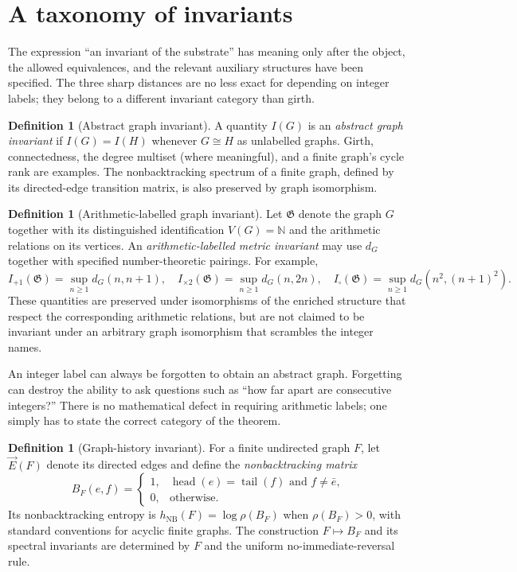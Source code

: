 \documentclass[11pt,a4paper]{article}
\theoremstyle{definition}\newtheorem{definition}[theorem]{Definition}
\newcommand{\N}{\mathbb N}
\newcommand{\G}{\mathfrak G}
\newcommand{\NB}{\mathrm{NB}}
\newcommand{\iso}{\cong}
\begin{document}
\section{A taxonomy of invariants}
\label{sec:invariants}
The expression ``an invariant of the substrate'' has meaning only after the object, the allowed equivalences, and the relevant auxiliary structures have been specified. The three sharp distances are no less exact for depending on integer labels; they belong to a different invariant category than girth.

\begin{definition}[Abstract graph invariant]
A quantity $I(G)$ is an \emph{abstract graph invariant} if $I(G)=I(H)$ whenever $G\iso H$ as unlabelled graphs. Girth, connectedness, the degree multiset (where meaningful), and a finite graph's cycle rank are examples. The nonbacktracking spectrum of a finite graph, defined by its directed-edge transition matrix, is also preserved by graph isomorphism.
\end{definition}

\begin{definition}[Arithmetic-labelled graph invariant]
Let $\G$ denote the graph $G$ together with its distinguished identification $V(G)=\N$ and the arithmetic relations on its vertices. An \emph{arithmetic-labelled metric invariant} may use $d_G$ together with specified number-theoretic pairings. For example,
\begin{equation}\label{eq:arithmeticI}
I_{+1}(\G)=\sup_{n\ge1}d_G(n,n+1),\quad
I_{\times2}(\G)=\sup_{n\ge1}d_G(n,2n),\quad
I_{\square}(\G)=\sup_{n\ge1}d_G(n^2,(n+1)^2).
\end{equation}
These quantities are preserved under isomorphisms of the enriched structure that respect the corresponding arithmetic relations, but are not claimed to be invariant under an arbitrary graph isomorphism that scrambles the integer names.
\end{definition}

An integer label can always be forgotten to obtain an abstract graph. Forgetting can destroy the ability to ask questions such as ``how far apart are consecutive integers?'' There is no mathematical defect in requiring arithmetic labels; one simply has to state the correct category of the theorem.

\begin{definition}[Graph-history invariant]
For a finite undirected graph $F$, let $\vec E(F)$ denote its directed edges and define the \emph{nonbacktracking matrix}
\begin{equation}\label{eq:BF}
B_F(e,f)=\begin{cases}
1,&\operatorname{head}(e)=\operatorname{tail}(f)\text{ and }f\ne\bar e,\\
0,&\text{otherwise}.
\end{cases}
\end{equation}
Its nonbacktracking entropy is $h_{\NB}(F)=\log\rho(B_F)$ when $\rho(B_F)>0$, with standard conventions for acyclic finite graphs. The construction $F\mapsto B_F$ and its spectral invariants are determined by $F$ and the uniform no-immediate-reversal rule.
\end{definition}
\end{document}
